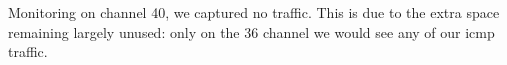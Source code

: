 Monitoring on channel 40, we captured no traffic. This is due to the extra space remaining largely unused: only on the 36 channel we would see any of our icmp traffic.
